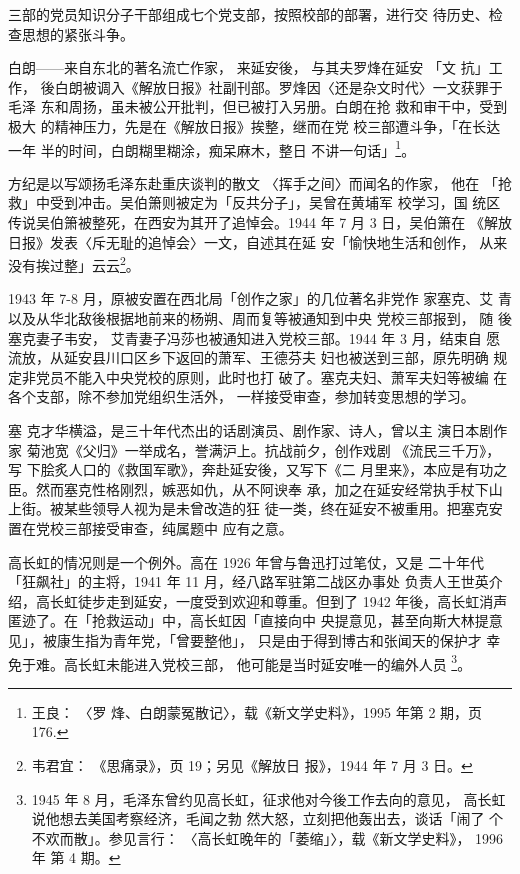 三部的党员知识分子干部组成七个党支部，按照校部的部署，进行交
待历史、检查思想的紧张斗争。

白朗——来自东北的著名流亡作家， 来延安後， 与其夫罗烽在延安 「文 抗」工作，
後白朗被调入《解放日报》社副刊部。罗烽因〈还是杂文时代〉一文获罪于毛泽
东和周扬，虽未被公开批判，但已被打入另册。白朗在抢 救和审干中，受到极大
的精神压力，先是在《解放日报》挨整，继而在党 校三部遭斗争，「在长达一年
半的时间，白朗糊里糊涂，痴呆麻木，整日 不讲一句话」\footnote{王良： 〈罗
烽、白朗蒙冤散记〉，载《新文学史料》，1995 年第 2 期，页 176.}。

方纪是以写颂扬毛泽东赴重庆谈判的散文 〈挥手之间〉而闻名的作家， 他在
「抢救」中受到冲击。吴伯箫则被定为「反共分子」，吴曾在黄埔军 校学习，国
统区传说吴伯箫被整死，在西安为其开了追悼会。1944 年 7 月 3 日，吴伯箫在
《解放日报》发表〈斥无耻的追悼会〉一文，自述其在延 安「愉快地生活和创作，
从来没有挨过整」云云\footnote{韦君宜： 《思痛录》，页 19；另见《解放日
报》，1944 年 7 月 3 日。}。

1943 年 7-8 月，原被安置在西北局「创作之家」的几位著名非党作 家塞克、艾
青以及从华北敌後根据地前来的杨朔、周而复等被通知到中央 党校三部报到， 随
後塞克妻子韦安， 艾青妻子冯莎也被通知进入党校三部。1944 年 3 月，结束自
愿流放，从延安县川口区乡下返回的萧军、王德芬夫 妇也被送到三部，原先明确
规定非党员不能入中央党校的原则，此时也打 破了。塞克夫妇、萧军夫妇等被编
在各个支部，除不参加党组织生活外， 一样接受审查，参加转变思想的学习。

塞 克才华横溢，是三十年代杰出的话剧演员、剧作家、诗人，曾以主 演日本剧作
家 菊池宽《父归》一举成名，誉满沪上。抗战前夕，创作戏剧 《流民三千万》，
写 下脍炙人口的《救国军歌》，奔赴延安後，又写下《二
月里来》，本应是有功之臣。然而塞克性格刚烈，嫉恶如仇，从不阿谀奉
承，加之在延安经常执手杖下山上街。被某些领导人视为是未曾改造的狂
徒一类，终在延安不被重用。把塞克安置在党校三部接受审查，纯属题中
应有之意。

高长虹的情况则是一个例外。高在 1926 年曾与鲁迅打过笔仗，又是 二十年代
「狂飙社」的主将，1941 年 11 月，经八路军驻第二战区办事处 负责人王世英介
绍，高长虹徒步走到延安，一度受到欢迎和尊重。但到了 1942 年後，高长虹消声
匿迹了。在「抢救运动」中，高长虹因「直接向中 央提意见，甚至向斯大林提意
见」，被康生指为青年党，「曾要整他」， 只是由于得到博古和张闻天的保护才
幸免于难。高长虹未能进入党校三部， 他可能是当时延安唯一的编外人员
\footnote{1945 年 8 月，毛泽东曾约见高长虹，征求他对今後工作去向的意见，
高长虹说他想去美国考察经济，毛闻之勃 然大怒，立刻把他轰出去，谈话「闹了
个不欢而散」。参见言行： 〈高长虹晚年的「萎缩」〉，载《新文学史料》，
1996 年 第 4 期。}。

